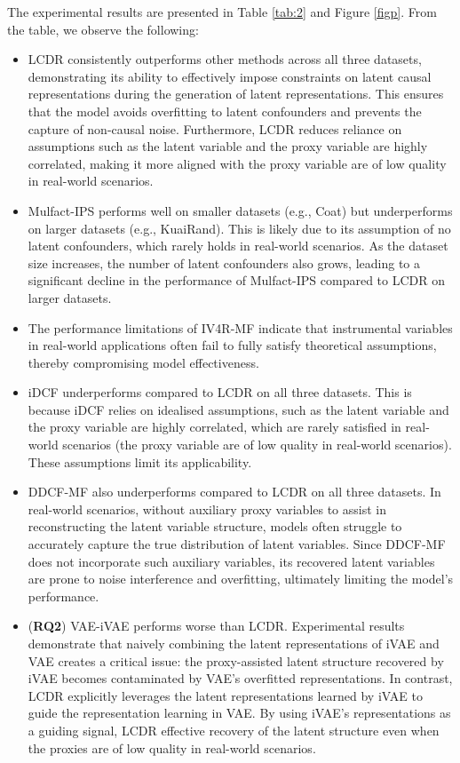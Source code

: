 \documentclass[sigconf]{acmart}
\begin{document}
The experimental results are presented in Table \ref{tab:2} and Figure \ref{figp}. From the table, we observe the following:

\begin{itemize}
\item LCDR consistently outperforms other methods across all three datasets, demonstrating its ability to effectively impose constraints on latent causal representations during the generation of latent representations. This ensures that the model avoids overfitting to latent confounders and prevents the capture of non-causal noise. Furthermore, LCDR reduces reliance on assumptions such as the latent variable and the proxy variable are highly correlated, making it more aligned with the proxy variable are of low quality in real-world scenarios. 
\item Mulfact-IPS performs well on smaller datasets (e.g., Coat) but underperforms on larger datasets (e.g., KuaiRand).  This is likely due to its assumption of no latent confounders, which rarely holds in real-world scenarios. As the dataset size increases, the number of latent confounders also grows, leading to a significant decline in the performance of Mulfact-IPS compared to LCDR on larger datasets.
\item The performance limitations of IV4R-MF indicate that instrumental variables in real-world applications often fail to fully satisfy theoretical assumptions, thereby compromising model effectiveness.
\item iDCF underperforms compared to LCDR on all three datasets. This is because iDCF relies on idealised assumptions, such as the latent variable and the proxy variable are highly correlated, which are rarely satisfied in real-world scenarios (the proxy variable are of low quality in real-world scenarios). These assumptions limit its applicability. 
\item DDCF-MF also underperforms compared to LCDR on all three datasets. In real-world scenarios, without auxiliary proxy variables to assist in reconstructing the latent variable structure, models often struggle to accurately capture the true distribution of latent variables. Since DDCF-MF does not incorporate such auxiliary variables, its recovered latent variables are prone to noise interference and overfitting, ultimately limiting the model's performance.
\item (\textbf{RQ2}) VAE-iVAE performs worse than LCDR. Experimental results demonstrate that naively combining the latent representations of iVAE and VAE creates a critical issue: the proxy-assisted latent structure recovered by iVAE becomes contaminated by VAE's overfitted representations. In contrast, LCDR explicitly leverages the latent representations learned by iVAE to guide the representation learning in VAE. By using iVAE’s representations as a guiding signal, LCDR effective recovery of the latent structure even when the proxies are of low quality in real-world scenarios. 
\end{itemize}
\end{document}
